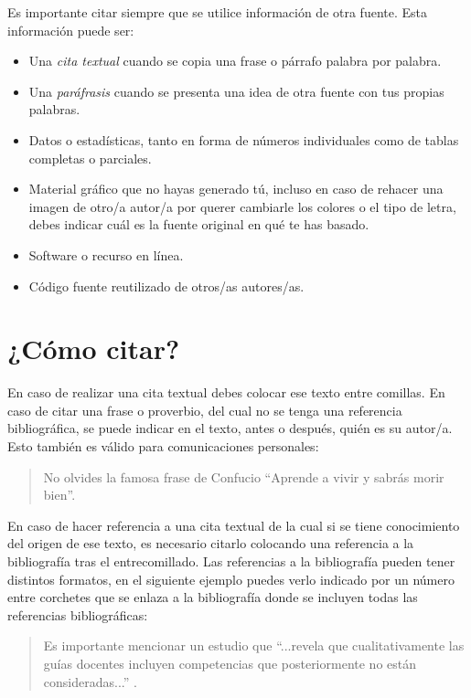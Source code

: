 Es importante citar siempre que se utilice información de otra fuente. Esta información puede ser:

\begin{itemize}
    \item Una {\em cita textual} cuando se copia una frase o párrafo palabra por palabra.
    \item Una {\em paráfrasis} cuando se presenta una idea de otra fuente con tus propias palabras.
    \item Datos o estadísticas, tanto en forma de números individuales como de tablas completas o parciales.
    \item Material gráfico que no hayas generado tú, incluso en caso de rehacer una imagen de otro/a autor/a por querer cambiarle los colores o el tipo de letra, debes indicar cuál es la fuente original en qué te has basado. 
    \item Software o recurso en línea.
    \item Código fuente reutilizado de otros/as autores/as.
\end{itemize}

\section{¿Cómo citar?}

En caso de realizar una cita textual debes colocar ese texto entre comillas. En caso de citar una frase o proverbio, del cual no se tenga una referencia bibliográfica, se puede indicar en el texto, antes o después, quién es su autor/a. Esto también es válido para comunicaciones personales:

\begin{quote}
\begin{it}
    No olvides la famosa frase de Confucio ``Aprende a vivir y sabrás morir bien''.
\end{it}
\end{quote}

En caso de hacer referencia a una cita textual de la cual si se tiene conocimiento del origen de ese texto, es necesario citarlo colocando una referencia a la bibliografía tras el entrecomillado. Las referencias a la bibliografía pueden tener distintos formatos, en el siguiente ejemplo puedes verlo indicado por un número entre corchetes que se enlaza a la bibliografía donde se incluyen todas las referencias bibliográficas:

\begin{quote}
\begin{it}
     Es importante mencionar un estudio que ``...revela que cualitativamente las guías docentes incluyen competencias que posteriormente no están consideradas...'' \cite{fernandez2023evaluacion}.
\end{it}
\end{quote}

